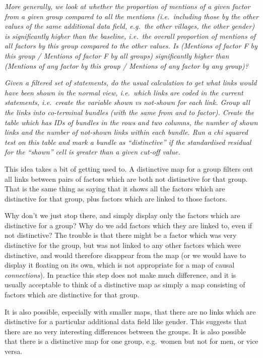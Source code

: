 \documentclass[
]{book}
\begin{document}
\emph{More generally, we look at whether the proportion of mentions of a given factor from a given group compared to all the mentions (i.e.~including those by the other values of the same additional data field, e.g.~the other villages, the other gender) is significantly higher than the baseline, i.e.~the overall proportion of mentions of all factors by this group compared to the other values. Is (Mentions of factor F by this group / Mentions of factor F by all groups) significantly higher than (Mentions of any factor by this group / Mentions of any factor by any group)?}

\emph{Given a filtered set of statements, do the usual calculation to get what links would have been shown in the normal view, i.e.~which links are coded in the current statements, i.e.~create the variable shown vs not-shown for each link. Group all the links into co-terminal bundles (with the same from and to factor). Create the table which has IDs of bundles in the rows and two columns, the number of shown links and the number of not-shown links within each bundle. Run a chi squared test on this table and mark a bundle as ``distinctive'' if the standardised residual for the ``shown'' cell is greater than a given cut-off value.}

This idea takes a bit of getting used to. A distinctive map for a group filters out all links between pairs of factors which are both not distinctive for that group. That is the same thing as saying that it shows all the factors which are distinctive for that group, plus factors which are linked to those factors.

Why don't we just stop there, and simply display only the factors which are distinctive for a group? Why do we add factors which they are linked to, even if not distinctive? The trouble is that there might be a factor which was very distinctive for the group, but was not linked to any other factors which were distinctive, and would therefore disappear from the map (or we would have to display it floating on its own, which is not appropriate for a map of causal \emph{connections}). In practice this step does not make much difference, and it is usually acceptable to think of a distinctive map as simply a map consisting of factors which are distinctive for that group.

It is also possible, especially with smaller maps, that there are no links which are distinctive for a particular additional data field like gender. This suggests that there are no very interesting differences between the groups. It is also possible that there is a distinctive map for one group, e.g.~women but not for men, or vice versa.
\end{document}
